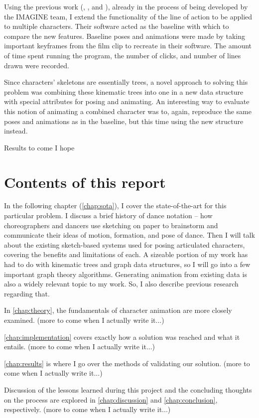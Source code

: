 Using the previous work (\citep{guay2013line}, \citep{guay2015adding}, and \citep{guay2015space}), already in the process of being developed by the IMAGINE team, I extend the functionality of the line of action to be applied to multiple characters. Their software acted as the baseline with which to compare the new features. Baseline poses and animations were made by taking important keyframes from the film clip to recreate in their software. The amount of time spent running the program, the number of clicks, and number of lines drawn were recorded.

Since characters' skeletons are essentially trees, a novel approach to solving this problem was combining these kinematic trees into one in a new data structure with special attributes for posing and animating. An interesting way to evaluate this notion of animating a combined character was to, again, reproduce the same poses and animations as in the baseline, but this time using the new structure instead.

Results to come I hope

\section{Contents of this report}

In the following chapter (\autoref{chap:sota}), I cover the state-of-the-art for this particular problem. I discuss a brief history of dance notation -- how choreographers and dancers use sketching on paper to brainstorm and communicate their ideas of motion, formation, and pose of dance. Then I will talk about the existing sketch-based systems used for posing articulated characters, covering the benefits and limitations of each. A sizeable portion of my work has had to do with kinematic trees and graph data structures, so I will go into a few important graph theory algorithms. Generating animation from existing data is also a widely relevant topic to my work. So, I also describe previous research regarding that.

In \autoref{chap:theory}, the fundamentals of character animation are more closely examined. (more to come when I actually write it...)

\autoref{chap:implementation} covers exactly how a solution was reached and what it entails. (more to come when I actually write it...)

\autoref{chap:results} is where I go over the methods of validating our solution. (more to come when I actually write it...)

Discussion of the lessons learned during this project and the concluding thoughts on the process are explored in \autoref{chap:discussion} and \autoref{chap:conclusion}, respectively. (more to come when I actually write it...)

